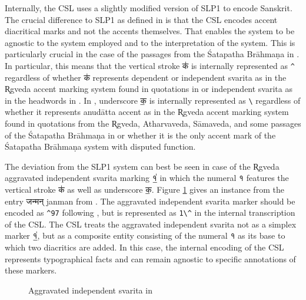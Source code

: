 Internally, the CSL uses a slightly modified version of SLP1 to encode Sanskrit. The crucial difference to SLP1 as defined in \citet{ScharfHyman2011} is that the CSL encodes accent diacritical marks and not the accents themselves. That enables the system to be agnostic to the system employed and to the interpretation of the system. This is particularly crucial in the case of the passages from the Śatapatha Brāhmaṇa in \citet{pwg}. In particular, this means that the vertical stroke {\devfont क॑} is internally represented as \texttt{\textasciicircum} regardless of whether {\devfont क॑} represents dependent or independent svarita as in the R̥gveda accent marking system found in quotations in \citet{pwg} or independent svarita as in the headwords in \citet{pwg}. In \citet{pwg}, underscore {\devfont क॒} is internally represented as \texttt{\textbackslash} regardless of whether it represents anudātta accent as in the R̥gveda accent marking system found in quotations from the R̥gveda, Atharvaveda, Sāmaveda, and some passages of the Śatapatha Brāhmaṇa in \citet{pwg} or whether it is the only accent mark of the Śatapatha Brāhmaṇa system with disputed function. 

The deviation from the SLP1 system can best be seen in case of the R̥gveda aggravated independent svarita marking {\devfont १॒॑} in which the numeral {\devfont १} features the vertical stroke {\devfont क॑} as well as underscore {\devfont क॒}.  Figure \ref{fig:RV-8-3-1-1} gives an instance from the entry {\devfont जन्मन्} janman from \citet{pwg}. The aggravated independent svarita marker should be encoded as \texttt{{\textasciicircum}97} following \citet{ScharfHyman2011}, but is represented as \texttt{1\textbackslash\textasciicircum} in the internal transcription of the CSL. The CSL treats the aggravated independent svarita not as a simplex marker {\devfont १॒॑}, but as a composite entity consisting of the numeral {\devfont १} as its base to which two diacritics are added. In this case, the internal encoding of the CSL represents typographical facts and can remain agnostic to specific annotations of these markers.  

\begin{figure}[!ht]
\begin{center}
\end{center}
\caption[Accent marking in the Śatapatha Brāhmaṇa]{\label{fig:RV-8-3-1-1}Aggravated independent svarita in \citet{pwg}}
\end{figure}


